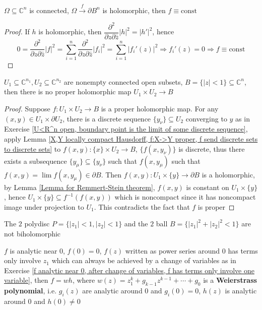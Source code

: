 \documentclass[main]{subfiles}
\begin{document}
\begin{lemma}\label{Lemma for Remmert-Stein theorem}
$\Omega\subseteq\mathbb C^n$ is connected, $\Omega\xrightarrow f\partial B^n$ is holomorphic, then $f\equiv\mathrm{const}$
\end{lemma}

\begin{proof}
If $h$ is holomorphic, then $\dfrac{\partial^2}{\partial z\partial\bar z}|h|^2=|h'|^2$, hence
\[0=\dfrac{\partial^2}{\partial z\partial\bar z}|f|^2=\sum_{i=1}^n\dfrac{\partial^2}{\partial z\partial\bar z}|f_i|^2=\sum_{i=1}^n|f_i'(z)|^2\Rightarrow f_i'(z)=0\Rightarrow f\equiv\mathrm{const}\]
\end{proof}

\begin{theorem}
$U_1\subseteq \mathbb C^{n_1},U_2\subseteq \mathbb C^{n_2}$ are nonempty connected open subsets, $B=\{|z|<1\}\subseteq \mathbb C^n$, then there is no proper holomorphic map $U_1\times U_2\to B$
\end{theorem}

\begin{proof}
Suppose $f:U_1\times U_2\to B$ is a proper holomorphic map. For any $(x,y)\in U_1\times\partial U_2$, there is a discrete sequence $\{y_\nu\}\subseteq U_2$ converging to $y$ as in Exercise \ref{U<R^n open, boundary point is the limit of some discrete sequence}, apply Lemma \ref{X,Y locally compact Hausdorff, f:X->Y proper, f send discrete sets to discrete sets} to $f(x,y):\{x\}\times U_2\to B$, $\{f(x,y_\nu)\}$ is discrete, thus there exists a subsequence $\{y_\mu\}\subseteq\{y_\nu\}$ such that $f(x,y_\mu)$ such that $f(x,y)=\lim f(x,y_\mu)\in\partial B$. Then $f(x,y):U_1\times\{y\}\to\partial B$ is a holomorphic, by Lemma \ref{Lemma for Remmert-Stein theorem}, $f(x,y)$ is constant on $U_1\times\{y\}$, hence $U_1\times\{y\}\subseteq f^{-1}(f(x,y))$ which is noncompact since it has noncompact image under projection to $U_1$. This contradicts the fact that $f$ is proper
\end{proof}

\begin{corollary}[Poincar\'e]
The $2$ polydisc $P=\{|z_1|<1,|z_2|<1\}$ and the $2$ ball $B=\{|z_1|^2+|z_2|^2<1\}$ are not biholomorphic
\end{corollary}

\begin{theorem}
$f$ is analytic near $0$, $f(0)=0$, $f(z)$ written as power series around $0$ has terms only involve $z_1$ which can always be achieved by a change of variables as in Exercise \ref{f analytic near 0, after change of variables, f has terms only involve one variable}, then $f=wh$, where $w(z)=z_1^k+g_{k-1}z^{k-1}+\cdots+g_0$ is a \textbf{Weierstrass polynomial}, i.e. $g_i(z)$ are analytic around $0$ and $g_i(0)=0$, $h(z)$ is analytic around $0$ and $h(0)\neq0$
\end{theorem}
\end{document}
